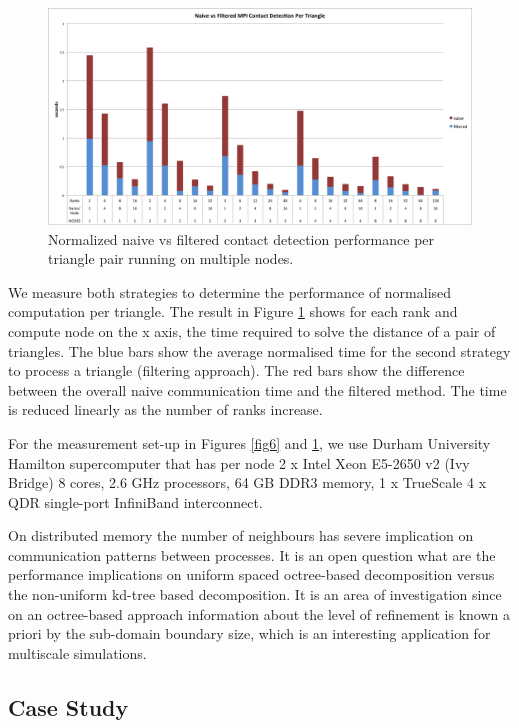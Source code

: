 \documentclass[times,12pt]{article}
\begin{document}
\begin{figure}[!h]
\centering
\includegraphics[width=1\textwidth]{mpi} \protect\caption{\label{fig7}Normalized naive vs filtered contact detection performance per triangle pair running on multiple nodes.}
\end{figure}

We measure both strategies to determine the performance of normalised computation per triangle. The result in Figure \ref{fig7} shows for each rank and compute node on the x axis, the time required to solve the distance of a pair of triangles. The blue bars show the average normalised time for the second strategy to process a triangle (filtering approach). The red bars show the difference between the overall naive communication time and the filtered method. The time is reduced linearly as the number of ranks increase.

For the measurement set-up in Figures \ref{fig6} and \ref{fig7}, we use Durham University Hamilton supercomputer that has per node 2 x Intel Xeon E5-2650 v2 (Ivy Bridge) 8 cores, 2.6 GHz processors, 64 GB DDR3 memory, 1 x TrueScale 4 x QDR single-port InfiniBand interconnect.



On distributed memory the number of neighbours has severe implication on communication patterns between processes. It is an open question what are the performance implications on uniform spaced octree-based decomposition versus the non-uniform kd-tree based decomposition. It is an area of investigation since on an octree-based approach information about the level of refinement is known a priori by the sub-domain boundary size, which is an interesting application for multiscale simulations. 





\subsection{Case Study}
\end{document}
